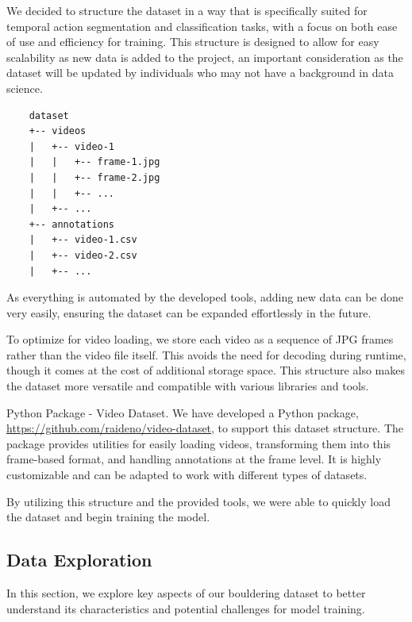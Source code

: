 We decided to structure the dataset in a way that is specifically suited for temporal action segmentation and classification tasks, with a focus on both ease of use and efficiency for training. This structure is designed to allow for easy scalability as new data is added to the project, an important consideration as the dataset will be updated by individuals who may not have a background in data science.

\begin{verbatim}
    dataset
    +-- videos
    |   +-- video-1
    |   |   +-- frame-1.jpg
    |   |   +-- frame-2.jpg
    |   |   +-- ...
    |   +-- ...
    +-- annotations
    |   +-- video-1.csv
    |   +-- video-2.csv
    |   +-- ...
\end{verbatim}

As everything is automated by the developed tools, adding new data can be done very easily, ensuring the dataset can be expanded effortlessly in the future.

To optimize for video loading, we store each video as a sequence of JPG frames rather than the video file itself. This avoids the need for decoding during runtime, though it comes at the cost of additional storage space. This structure also makes the dataset more versatile and compatible with various libraries and tools.

\begin{AIbox}{Python Package - Video Dataset.}
  We have developed a Python package, \href{https://github.com/raideno/video-dataset}{https://github.com/raideno/video-dataset}, to support this dataset structure. The package provides utilities for easily loading videos, transforming them into this frame-based format, and handling annotations at the frame level. It is highly customizable and can be adapted to work with different types of datasets.
\end{AIbox}

By utilizing this structure and the provided tools, we were able to quickly load the dataset and begin training the model.

\subsection{Data Exploration}  
In this section, we explore key aspects of our bouldering dataset to better understand its characteristics and potential challenges for model training.



